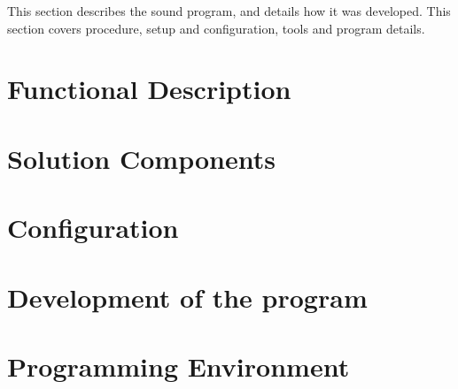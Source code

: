 This section describes the sound program, and details how it was developed. This section covers procedure, setup and configuration, tools and program details.

\section{Functional Description}
	

\section{Solution Components}
	

\section{Configuration}
	

\section{Development of the program}
	

\section{Programming Environment}
	
